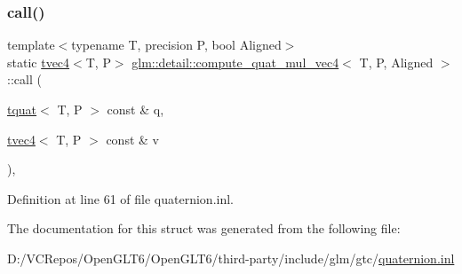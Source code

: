 \subsubsection{\texorpdfstring{call()}{call()}}
{\footnotesize\ttfamily template$<$typename T, precision P, bool Aligned$>$ \\
static \mbox{\hyperlink{structglm_1_1tvec4}{tvec4}}$<$T, P$>$ \mbox{\hyperlink{structglm_1_1detail_1_1compute__quat__mul__vec4}{glm\+::detail\+::compute\+\_\+quat\+\_\+mul\+\_\+vec4}}$<$ T, P, Aligned $>$\+::call (\begin{DoxyParamCaption}\item[{\mbox{\hyperlink{structglm_1_1tquat}{tquat}}$<$ T, P $>$ const \&}]{q,  }\item[{\mbox{\hyperlink{structglm_1_1tvec4}{tvec4}}$<$ T, P $>$ const \&}]{v }\end{DoxyParamCaption})\hspace{0.3cm}{\ttfamily [inline]}, {\ttfamily [static]}}



Definition at line 61 of file quaternion.\+inl.



The documentation for this struct was generated from the following file\+:\begin{DoxyCompactItemize}
\item 
D\+:/\+V\+C\+Repos/\+Open\+G\+L\+T6/\+Open\+G\+L\+T6/third-\/party/include/glm/gtc/\mbox{\hyperlink{gtc_2quaternion_8inl}{quaternion.\+inl}}\end{DoxyCompactItemize}
